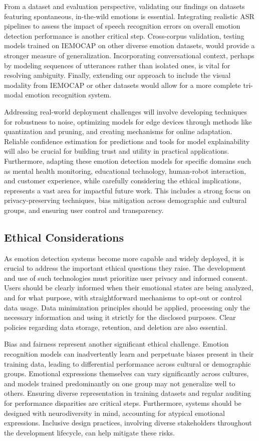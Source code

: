 \documentclass[12pt]{article}
\begin{document}
From a dataset and evaluation perspective, validating our findings on datasets featuring spontaneous, in-the-wild emotions is essential. Integrating realistic ASR pipelines to assess the impact of speech recognition errors on overall emotion detection performance is another critical step. Cross-corpus validation, testing models trained on IEMOCAP on other diverse emotion datasets, would provide a stronger measure of generalization. Incorporating conversational context, perhaps by modeling sequences of utterances rather than isolated ones, is vital for resolving ambiguity. Finally, extending our approach to include the visual modality from IEMOCAP or other datasets would allow for a more complete tri-modal emotion recognition system.

Addressing real-world deployment challenges will involve developing techniques for robustness to noise, optimizing models for edge devices through methods like quantization and pruning, and creating mechanisms for online adaptation. Reliable confidence estimation for predictions and tools for model explainability will also be crucial for building trust and utility in practical applications. Furthermore, adapting these emotion detection models for specific domains such as mental health monitoring, educational technology, human-robot interaction, and customer experience, while carefully considering the ethical implications, represents a vast area for impactful future work. This includes a strong focus on privacy-preserving techniques, bias mitigation across demographic and cultural groups, and ensuring user control and transparency.

\subsection{Ethical Considerations}
As emotion detection systems become more capable and widely deployed, it is crucial to address the important ethical questions they raise. The development and use of such technologies must prioritize user privacy and informed consent. Users should be clearly informed when their emotional states are being analyzed, and for what purpose, with straightforward mechanisms to opt-out or control data usage. Data minimization principles should be applied, processing only the necessary information and using it strictly for the disclosed purposes. Clear policies regarding data storage, retention, and deletion are also essential.

Bias and fairness represent another significant ethical challenge. Emotion recognition models can inadvertently learn and perpetuate biases present in their training data, leading to differential performance across cultural or demographic groups. Emotional expressions themselves can vary significantly across cultures, and models trained predominantly on one group may not generalize well to others. Ensuring diverse representation in training datasets and regular auditing for performance disparities are critical steps. Furthermore, systems should be designed with neurodiversity in mind, accounting for atypical emotional expressions. Inclusive design practices, involving diverse stakeholders throughout the development lifecycle, can help mitigate these risks.
\end{document}
